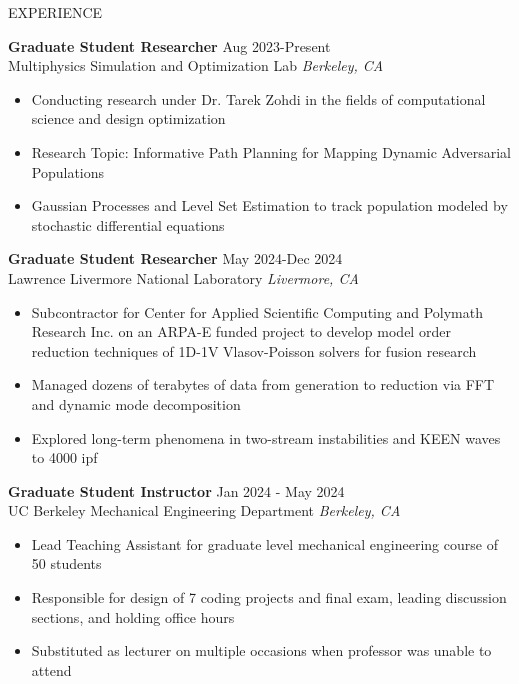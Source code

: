 \documentclass{resume} %
\begin{document}


\begin{rSection}{EXPERIENCE}

\textbf{Graduate Student Researcher} \hfill Aug 2023-Present\\
Multiphysics Simulation and Optimization Lab \hfill \textit{Berkeley, CA}
 \begin{itemize}
     pt {}
    \item Conducting research under Dr. Tarek Zohdi in the fields of computational science and design optimization
    \item Research Topic: Informative Path Planning for Mapping Dynamic Adversarial Populations
    \item Gaussian Processes and Level Set Estimation to track population modeled by stochastic differential equations
 \end{itemize}

\textbf{Graduate Student Researcher} \hfill May 2024-Dec 2024\\
Lawrence Livermore National Laboratory \hfill \textit{Livermore, CA}
 \begin{itemize}
     pt {}
    \item Subcontractor for Center for Applied Scientific Computing and Polymath Research Inc. on an ARPA-E funded project to develop model order reduction techniques of 1D-1V Vlasov-Poisson solvers for fusion research
    \item Managed dozens of terabytes of data from generation to reduction via FFT and dynamic mode decomposition 
    \item Explored long-term phenomena in two-stream instabilities and KEEN waves to 4000 ipf 
 \end{itemize}
 
\textbf{Graduate Student Instructor} \hfill Jan 2024 - May 2024\\
UC Berkeley Mechanical Engineering Department \hfill \textit{Berkeley, CA}
 \begin{itemize}
    \itemsep -6pt {} 
     \item Lead Teaching Assistant for graduate level mechanical engineering course of 50 students
     \item Responsible for design of 7 coding projects and final exam, leading discussion sections, and holding office hours
     \item Substituted as lecturer on multiple occasions when professor was unable to attend
 \end{itemize}


\end{rSection}
\end{document}
